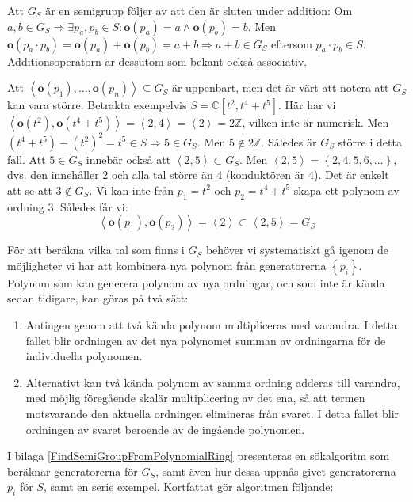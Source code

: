 Att $G_S$ är en semigrupp följer av att den är sluten under addition: Om $a,b\in G_S \Longrightarrow \exists p_a, p_b \in S:\mathbf{o}(p_a)=a \wedge \mathbf{o}(p_b)=b$. Men $\mathbf{o}(p_a \cdot p_b) = \mathbf{o}(p_a) + \mathbf{o}(p_b) = a + b \Longrightarrow a + b \in G_S$ eftersom $p_a \cdot p_b \in S$. Additionsoperatorn är dessutom som bekant också associativ.

Att $\left<\mathbf{o}(p_1),\ldots,\mathbf{o}(p_n)\right> \subseteq G_S$ är uppenbart, men det är värt att notera att $G_S$ kan vara större. Betrakta exempelvis $S=\mathbb{C}[t^2,t^4+t^5]$. Här har vi $\left<\mathbf{o}(t^2),\mathbf{o}(t^4+t^5)\right> = \left<2,4\right>=\left<2\right> = 2\mathbb{Z}$, vilken inte är numerisk. Men $\left(t^4+t^5\right)-\left(t^2\right)^2 = t^5 \in S \Longrightarrow 5 \in G_S$. Men $5 \notin 2\mathbb{Z}$. Således är $G_S$ större i detta fall. Att $5 \in G_S$ innebär också att $\left<2,5\right> \subset G_S$. Men $\left<2,5\right> = \left\{2, 4, 5, 6, \ldots\right\}$, dvs. den innehåller 2 och alla tal större än 4 (konduktören är 4). Det är enkelt att se att $3 \notin G_S$. Vi kan inte från $p_1=t^2$ och $p_2=t^4+t^5$ skapa ett polynom av ordning 3. Således får vi:
\[\left<\mathbf{o}(p_1),\mathbf{o}(p_2)\right> = \left<2\right> \subset \left<2,5\right> = G_S \]

\label{SearchPolynomials}
För att beräkna vilka tal som finns i $G_S$ behöver vi systematiskt gå igenom de möjligheter vi har att kombinera nya polynom från generatorerna $\left\{p_i\right\}$. Polynom som kan generera polynom av nya ordningar, och som inte är kända sedan tidigare, kan göras på två sätt:

\begin{enumerate}
\item Antingen genom att två kända polynom multipliceras med varandra. I detta fallet blir ordningen av det nya polynomet summan av ordningarna för de individuella polynomen.

\item Alternativt kan två kända polynom av samma ordning adderas till varandra, med möjlig föregående skalär multiplicering av det ena, så att termen motsvarande den aktuella ordningen elimineras från svaret. I detta fallet blir ordningen av svaret beroende av de ingående polynomen.
\end{enumerate}

I bilaga \ref{FindSemiGroupFromPolynomialRing} presenteras en sökalgoritm som beräknar generatorerna för $G_S$, samt även hur dessa uppnås givet generatorerna $p_i$ för $S$, samt en serie exempel. Kortfattat gör algoritmen följande:

